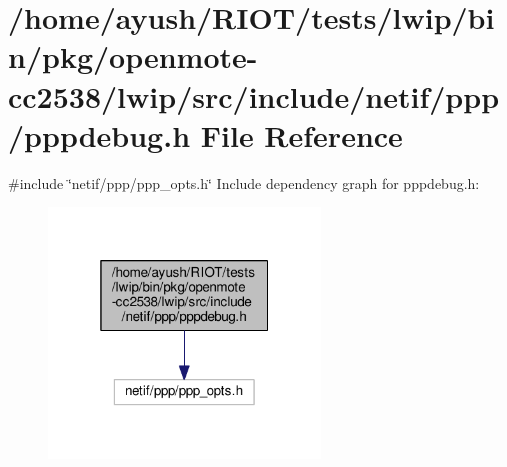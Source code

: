 \hypertarget{openmote-cc2538_2lwip_2src_2include_2netif_2ppp_2pppdebug_8h}{}\section{/home/ayush/\+R\+I\+O\+T/tests/lwip/bin/pkg/openmote-\/cc2538/lwip/src/include/netif/ppp/pppdebug.h File Reference}
\label{openmote-cc2538_2lwip_2src_2include_2netif_2ppp_2pppdebug_8h}
{\ttfamily \#include \char`\"{}netif/ppp/ppp\+\_\+opts.\+h\char`\"{}}\newline
Include dependency graph for pppdebug.\+h\+:
\nopagebreak
\begin{figure}[H]
\begin{center}
\leavevmode
\includegraphics[width=205pt]{openmote-cc2538_2lwip_2src_2include_2netif_2ppp_2pppdebug_8h__incl}
\end{center}
\end{figure}
